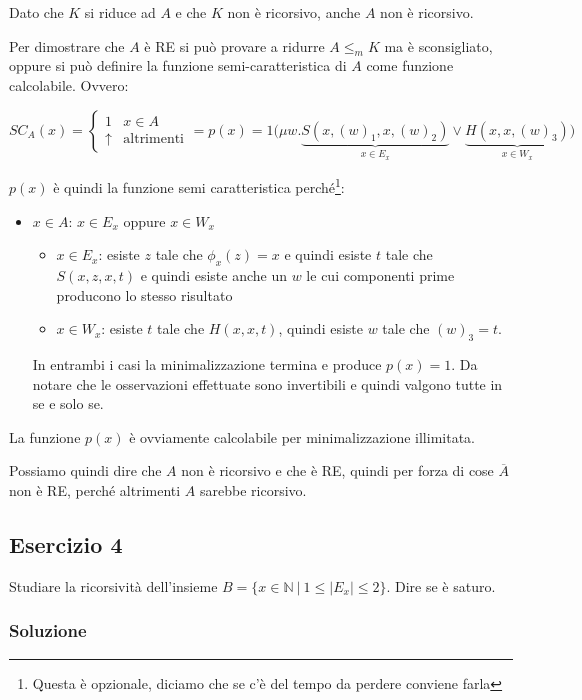 Dato che $K$ si riduce ad $A$ e che $K$ non è ricorsivo, anche $A$ non è ricorsivo.

Per dimostrare che $A$ è RE si può provare a ridurre $A \leq_m K$ ma è sconsigliato, oppure si può definire la funzione semi-caratteristica di $A$ come funzione calcolabile.
Ovvero:

$$
SC_A(x) = \begin{cases}
1 &x \in A \\
\uparrow &\text{altrimenti}
\end{cases}  = p(x) =  1 \Big( \mu w . \underbrace{S(x, (w)_1, x, (w)_2)}_{x \in E_x} \vee \underbrace{H(x,x,(w)_3)}_{x \in W_x} \Big)
$$

$p(x)$ è quindi la funzione semi caratteristica  perché\footnote{Questa è opzionale, diciamo che se c'è del tempo da perdere conviene farla}:

\begin{itemize}
	\item $x \in A$:  $ x \in E_x $ oppure $ x \in W_x$
	\begin{itemize}
		\item $x \in E_x$: esiste $z$ tale che $\phi_x(z) = x$ e quindi esiste $t$ tale che $S(x,z,x,t)$ e quindi esiste anche un $w$ le cui componenti prime producono lo stesso risultato
		\item $x \in W_x$: esiste $t$ tale che $H(x,x,t)$, quindi esiste $w$ tale che $(w)_3 = t$.
	\end{itemize}
	In entrambi i casi la minimalizzazione termina e produce $p(x) = 1$. Da notare che le osservazioni effettuate sono invertibili e quindi valgono tutte in se e solo se.
\end{itemize}

La funzione $p(x)$ è ovviamente calcolabile per minimalizzazione illimitata.

Possiamo quindi dire che $A$ non è ricorsivo e che è RE, quindi per forza di cose $\overline{A}$ non è RE, perché altrimenti $A$ sarebbe ricorsivo.

\subsection{Esercizio 4}

Studiare la ricorsività dell'insieme $ B = \{ x \in \mathbb{N} \:|\: 1 \leq | E_x| \leq 2 \}$. Dire se è saturo.

\subsubsection{Soluzione}

